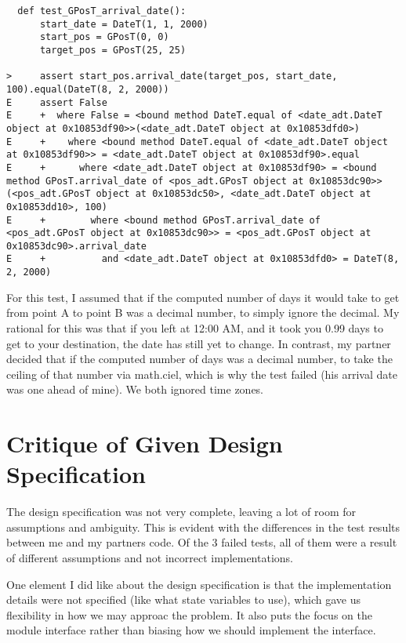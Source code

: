 \documentclass[12pt]{article}
\begin{document}
\begin{lstlisting}
  def test_GPosT_arrival_date():
      start_date = DateT(1, 1, 2000)
      start_pos = GPosT(0, 0)
      target_pos = GPosT(25, 25)

>     assert start_pos.arrival_date(target_pos, start_date, 100).equal(DateT(8, 2, 2000))
E     assert False
E     +  where False = <bound method DateT.equal of <date_adt.DateT object at 0x10853df90>>(<date_adt.DateT object at 0x10853dfd0>)
E     +    where <bound method DateT.equal of <date_adt.DateT object at 0x10853df90>> = <date_adt.DateT object at 0x10853df90>.equal
E     +      where <date_adt.DateT object at 0x10853df90> = <bound method GPosT.arrival_date of <pos_adt.GPosT object at 0x10853dc90>>(<pos_adt.GPosT object at 0x10853dc50>, <date_adt.DateT object at 0x10853dd10>, 100)
E     +        where <bound method GPosT.arrival_date of <pos_adt.GPosT object at 0x10853dc90>> = <pos_adt.GPosT object at 0x10853dc90>.arrival_date
E     +          and <date_adt.DateT object at 0x10853dfd0> = DateT(8, 2, 2000)
\end{lstlisting}

For this test, I assumed that if the computed number of days it would take to get from point A to point B was a decimal number, to simply ignore the decimal. My rational for this was that if you left at 12:00 AM, and it took you 0.99 days to get to your destination, the date has still yet to change. In contrast, my partner decided that if the computed number of days was a decimal number, to take the ceiling of that number via math.ciel, which is why the test failed (his arrival date was one ahead of mine). We both ignored time zones.
\\

\section{Critique of Given Design Specification}

The design specification was not very complete, leaving a lot of room for assumptions and ambiguity. This is evident with the differences in the test results between me and my partners code. Of the 3 failed tests, all of them were a result of different assumptions and not incorrect implementations. 

One element I did like about the design specification is that the implementation details were not specified (like what state variables to use), which gave us flexibility in how we may approac the problem. It also puts the focus on the module interface rather than biasing how we should implement the interface.
\\
\end{document}

